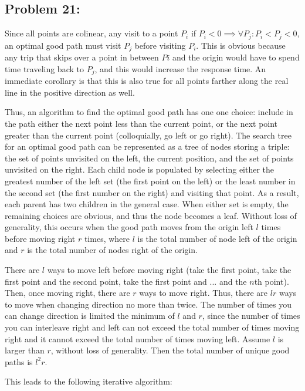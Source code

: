 \documentclass[12pt]{article}
\begin{document}
\subsection*{Problem 21: }

Since all points are colinear, any visit to a point $P_{i}$ if $P_{i} < 0 \implies \forall P_{j} : P_{i} < P_{j} < 0$, an optimal good path must visit $P_{j}$ before visiting $P_{i}$. This is obvious because any trip that skips over a point in between $P{i}$ and the origin would have to spend time traveling back to $P_{j}$, and this would increase the response time. An immediate corollary is that this is also true for all points farther along the real line in the positive direction as well.

Thus, an algorithm to find the optimal good path has one one choice: include in the path either the next point less than the current point, or the next point greater than the current point (colloquially, go left or go right). The search tree for an optimal good path can be represented as a tree of nodes storing a triple: the set of points unvisited on the left, the current position, and the set of points unvisited on the right. Each child node is populated by selecting either the greatest number of the left set (the first point on the left) or the least number in the second set (the first number on the right) and visiting that point. As a result, each parent has two children in the general case. When either set is empty, the remaining choices are obvious, and thus the node becomes a leaf. Without loss of generality, this occurs when the good path moves from the origin left $l$ times before moving right $r$ times, where $l$ is the total number of node left of the origin and $r$ is the total number of nodes right of the origin.

There are $l$ ways to move left before moving right (take the first point, take the first point and the second point, take the first point and ... and the $n$th point). Then, once moving right, there are $r$ ways to move right. Thus, there are $lr$ ways to move when changing direction no more than twice. The number of times you can change direction is limited the minimum of $l$ and $r$, since the number of times you can interleave right and left can not exceed the total number of times moving right and it cannot exceed the total number of times moving left. Assume $l$ is larger than $r$, without loss of generality. Then the total number of unique good paths is $l^{2}r$.

This leads to the following iterative algorithm:
\end{document}
